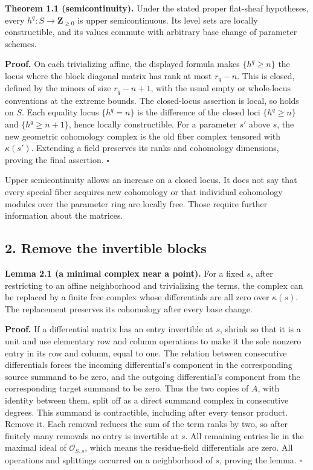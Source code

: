 \documentclass[11pt]{article}
\begin{document}
\textbf{Theorem 1.1 (semicontinuity).} Under the stated proper
flat-sheaf hypotheses, every \(h^q:S\to\mathbf Z_{\geq0}\) is upper
semicontinuous. Its level sets are locally constructible, and its values
commute with arbitrary base change of parameter schemes.

\textbf{Proof.} On each trivializing affine, the displayed formula makes
\(\{h^q\geq n\}\) the locus where the block diagonal matrix has rank at
most \(r_q-n\). This is closed, defined by the minors of size
\(r_q-n+1\), with the usual empty or whole-locus conventions at the
extreme bounds. The closed-locus assertion is local, so holds on \(S\).
Each equality locus \(\{h^q=n\}\) is the difference of the closed loci
\(\{h^q\geq n\}\) and \(\{h^q\geq n+1\}\), hence locally constructible.
For a parameter \(s'\) above \(s\), the new geometric cohomology complex
is the old fiber complex tensored with \(\kappa(s')\). Extending a field
preserves its ranks and cohomology dimensions, proving the final
assertion. \(\square\)

Upper semicontinuity allows an increase on a closed locus. It does not
say that every special fiber acquires new cohomology or that individual
cohomology modules over the parameter ring are locally free. Those
require further information about the matrices.

\subsection{2. Remove the invertible
blocks}\label{remove-the-invertible-blocks}

\textbf{Lemma 2.1 (a minimal complex near a point).} For a fixed \(s\),
after restricting to an affine neighborhood and trivializing the terms,
the complex can be replaced by a finite free complex whose differentials
are all zero over \(\kappa(s)\). The replacement preserves its
cohomology after every base change.

\textbf{Proof.} If a differential matrix has an entry invertible at
\(s\), shrink so that it is a unit and use elementary row and column
operations to make it the sole nonzero entry in its row and column,
equal to one. The relation between consecutive differentials forces the
incoming differential's component in the corresponding source summand to
be zero, and the outgoing differential's component from the
corresponding target summand to be zero. Thus the two copies of \(A\),
with identity between them, split off as a direct summand complex in
consecutive degrees. This summand is contractible, including after every
tensor product. Remove it. Each removal reduces the sum of the term
ranks by two, so after finitely many removals no entry is invertible at
\(s\). All remaining entries lie in the maximal ideal of
\(\mathcal O_{S,s}\), which means the residue-field differentials are
zero. All operations and splittings occurred on a neighborhood of \(s\),
proving the lemma. \(\square\)
\end{document}

